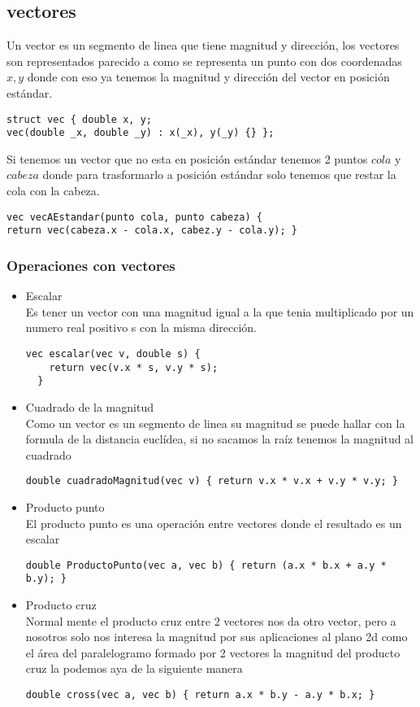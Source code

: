 \subsection{vectores}
Un vector es un segmento de linea que tiene magnitud y dirección, los vectores son representados parecido a como se
representa un punto con dos coordenadas $x, y$ donde con eso ya tenemos la magnitud y dirección del vector en posición estándar.
\begin{lstlisting}[style=C]
struct vec { double x, y;
vec(double _x, double _y) : x(_x), y(_y) {} };
\end{lstlisting}
Si tenemos un vector que no esta en posición estándar tenemos 2 puntos $cola$ y $cabeza$ donde para trasformarlo a posición estándar
solo tenemos que restar la cola con la cabeza.
\begin{lstlisting}[style=C]
vec vecAEstandar(punto cola, punto cabeza) {
return vec(cabeza.x - cola.x, cabez.y - cola.y); }
\end{lstlisting}
\subsubsection{Operaciones con vectores}
\begin{itemize}
  \item Escalar
  \\
  Es tener un vector con una magnitud igual a la que tenia multiplicado por un numero real positivo s con la misma dirección.
  \begin{lstlisting}[style=C]
  vec escalar(vec v, double s) {
    return vec(v.x * s, v.y * s);
  }
  \end{lstlisting}
  \item Cuadrado de la magnitud
  \\
  Como un vector es un segmento de linea su magnitud se puede hallar con la formula de la distancia euclídea, si
  no sacamos la raíz tenemos la magnitud al cuadrado
  \begin{lstlisting}[style=C]
  double cuadradoMagnitud(vec v) { return v.x * v.x + v.y * v.y; }
  \end{lstlisting}
  \item Producto punto
  \\
  El producto punto es una operación entre vectores donde el resultado es un escalar
  \begin{lstlisting}[style=C]
  double ProductoPunto(vec a, vec b) { return (a.x * b.x + a.y * b.y); }
  \end{lstlisting}
  \item Producto cruz
  \\
  Normal mente el producto cruz entre 2 vectores nos da otro vector, pero a nosotros solo nos interesa la magnitud por sus
  aplicaciones al plano 2d como el área del paralelogramo formado por 2 vectores la magnitud del producto cruz la podemos aya de la
  siguiente manera
  \begin{lstlisting}[style=C]
  double cross(vec a, vec b) { return a.x * b.y - a.y * b.x; }
  \end{lstlisting}
\end{itemize}
